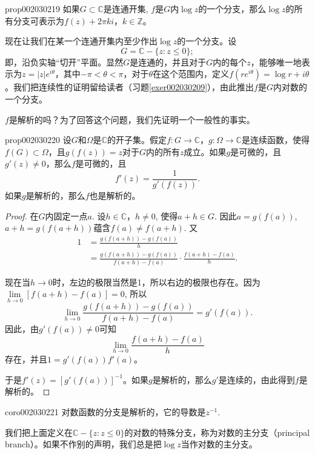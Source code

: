 \begin{proposition}{}{prop002030219}
如果$G \subset \mathbb{C}$是连通开集, $f$是$G$内$\log{z}$的一个分支，那么$\log{z}$的所有分支可表示为$f(z) + 2\pi{}ki$，$k \in \mathbb{Z}$。
\end{proposition}

现在让我们在某一个连通开集内至少作出$\log{z}$的一个分支。设
\[
G = \mathbb{C} - \{z: z \le 0\};
\]
即，沿负实轴“切开”平面。显然$G$是连通的，并且对于$G$内的每个$z$，能够唯一地表示为$z = |z|e^{i\theta}$，其中$-\pi < \theta < \pi$，对于$\theta$在这个范围内，定义$f(re^{i\theta}) = \log{r} + i\theta$。我们把连续性的证明留给读者（习题\ref{exer002030209}），由此推出$f$是$G$内对数的一个分支。

$f$是解析的吗？为了回答这个问题，我们先证明一个一般性的事实。

\begin{proposition}{}{prop002030220}
设$G$和$\Omega$是$\mathbb{C}$的开子集。假定$f: G \to \mathbb{C}$，$g: \Omega \to \mathbb{C}$是连续函数，使得$f(G) \subset \Omega$，且$g(f(z)) = z$对于$G$内的所有$z$成立。如果$g$是可微的，且$g'(z) \neq 0$，那么$f$是可微的，且
\[
f'(z) = \frac{1}{g'(f(z))}.
\]
如果$g$是解析的，那么$f$也是解析的。
\end{proposition}

\begin{proof}
在$G$内固定一点$a$. 设$h \in \mathbb{C}$，$h \neq 0$, 使得$a + h \in G$. 因此$a = g(f(a))$, $a + h = g(f(a + h))$蕴含$f(a) \neq f(a + h)$. 又
\[
\begin{aligned}
1 &= \frac{g(f(a + h)) - g(f(a))}{h}\\
&=\frac{g(f(a + h)) - g(f(a))}{f(a + h) - f(a)} \cdot \frac{f(a + h) - f(a)}{h}.
\end{aligned}
\]

现在当$h \to 0$时，左边的极限当然是1，所以右边的极限也存在。因为$\lim\limits_{h \to 0}{[f(a + h) - f(a)]} = 0$, 所以
\[
\lim_{h \to 0}{\frac{g(f(a + h)) - g(f(a))}{f(a+h) - f(a)}} = g'(f(a)).
\]
因此，由$g'(f(a)) \neq 0$可知
\[
\lim_{h \to 0}{\frac{f(a + h) - f(a)}{h}}
\]
存在，并且$1 = g'(f(a))f'(a)$。

于是$f'(z) = [g'(f(a))]^{-1}$。如果$g$是解析的，那么$g'$是连续的，由此得到$f$是解析的。
\end{proof}

\begin{corollary}{}{coro002030221}
对数函数的分支是解析的，它的导数是$z^{-1}$.
\end{corollary}

我们把上面定义在$\mathbb{C} - \{z:z \le 0\}$的对数的特殊分支，称为对数的主分支（principal branch）。如果不作别的声明，我们总是把$\log{z}$当作对数的主分支。

